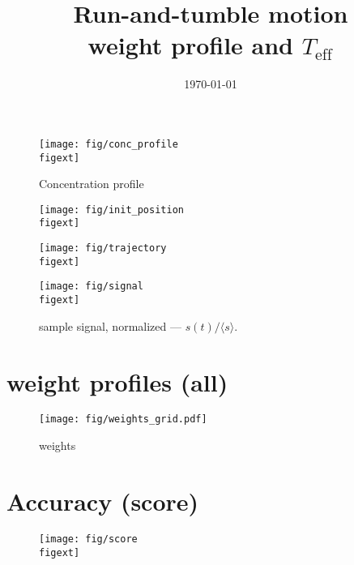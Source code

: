 \documentclass{article}
\title{\huge Run-and-tumble motion \\ \large weight profile and $T_{\mathrm{eff}}$}
\date{\today}
\begin{document}

\maketitle

\noindent\hrulefill
{}
\noindent\hrulefill

\begin{minipage}{0.55\textwidth}
\begin{figure}[H]
\texttt{[image: fig/conc\_profile\\figext]}
\caption{Concentration profile}
\end{figure}
\end{minipage}
\begin{minipage}{0.25\textwidth}
\end{minipage}\hfill

\begin{minipage}{0.48\textwidth}
\begin{figure}[H]
\texttt{[image: fig/init\_position\\figext]}
\end{figure}
\end{minipage}
\begin{minipage}{0.48\textwidth}
\begin{figure}[H]
\texttt{[image: fig/trajectory\\figext]}
\end{figure}
\end{minipage}\hfill


\begin{figure}[H]
\texttt{[image: fig/signal\\figext]}
\caption{sample signal, normalized ---  $s(t)/\langle s \rangle$.}
\hfill
\end{figure}

\section*{weight profiles (all)}

\begin{figure}[H]
\begin{center}
\hspace*{-1cm}\texttt{[image: fig/weights\_grid.pdf]}
\end{center}
\caption{weights}
\end{figure}

\section*{Accuracy (score)}
\begin{figure}[H]
\texttt{[image: fig/score\\figext]}
\end{figure}
\end{document}

